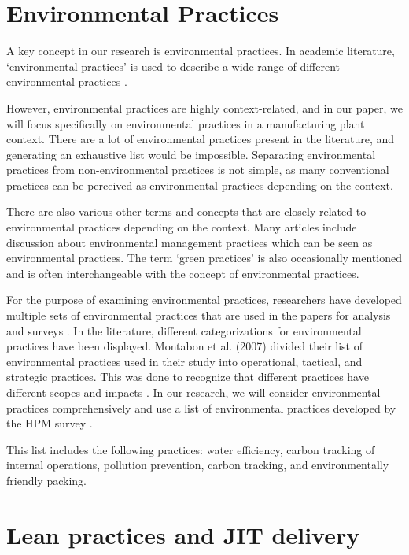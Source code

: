 \section{Environmental Practices}
A key concept in our research is environmental practices. 
In academic literature, ‘environmental practices’ is used to describe a wide range of different environmental practices \citep{montabonExaminationCorporateReporting2007}. 

However, environmental practices are highly context-related, and in our paper, we will focus specifically on environmental practices in a manufacturing plant context. 
There are a lot of environmental practices present in the literature, and generating an exhaustive list would be impossible. 
Separating environmental practices from non-environmental practices is not simple, as many conventional practices can be perceived as environmental practices depending on the context.

There are also various other terms and concepts that are closely related to environmental practices depending on the context. 
Many articles include discussion about environmental management practices which can be seen as environmental practices. 
The term ‘green practices’ is also occasionally mentioned and is often interchangeable with the concept of environmental practices.

For the purpose of examining environmental practices, researchers have developed multiple sets of environmental practices that are used in the papers for analysis and surveys \citep{montabonExaminationCorporateReporting2007, zhuRelationshipsOperationalPractices2004}. 
In the literature, different categorizations for environmental practices have been displayed. 
Montabon et al. (2007) divided their list of environmental practices used in their study into operational, tactical, and strategic practices. 
This was done to recognize that different practices have different scopes and impacts \citep{montabonExaminationCorporateReporting2007}. 
In our research, we will consider environmental practices comprehensively and use a list of environmental practices developed by the HPM survey \citep{turkulainen2023}. 

This list includes the following practices: water efficiency, carbon tracking of internal operations, pollution prevention, carbon tracking, and environmentally friendly packing.

\section{Lean practices and JIT delivery}
